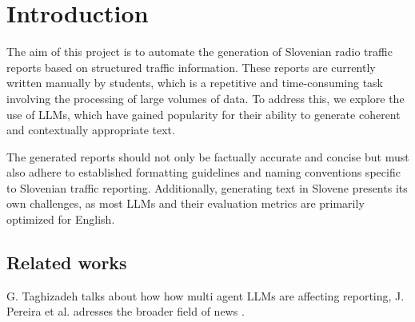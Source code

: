\documentclass[fleqn,moreauthors,10pt]{ds_report}
\affiliation{\textit{Advisors: Slavko Žitnik}}
\begin{document}
\flushbottom 

\maketitle 

\thispagestyle{empty} 


\section*{Introduction}

The aim of this project is to automate the generation of Slovenian radio traffic reports based on structured traffic information. These reports are currently written manually by students, which is a repetitive and time-consuming task involving the processing of large volumes of data. To address this, we explore the use of LLMs, which have gained popularity for their ability to generate coherent and contextually appropriate text.

The generated reports should not only be factually accurate and concise but must also adhere to established formatting guidelines and naming conventions specific to Slovenian traffic reporting. Additionally, generating text in Slovene presents its own challenges, as most LLMs and their evaluation metrics are primarily optimized for English.

\subsection*{Related works}
G. Taghizadeh \cite{llmReporting} talks about how how multi agent LLMs are affecting reporting, J. Pereira et al. adresses the broader field of news \cite{pereira2024generation}.
\end{document}
